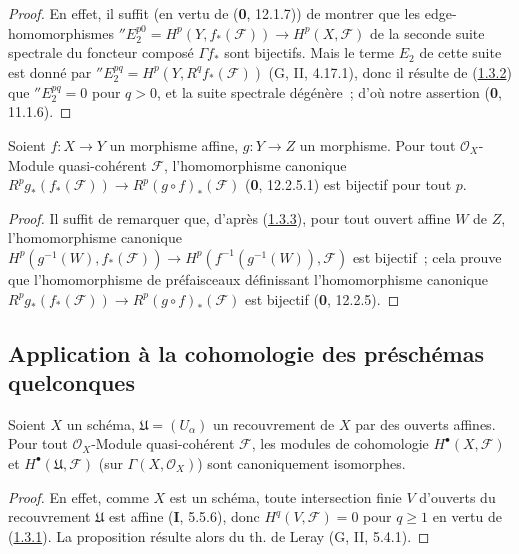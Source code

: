\begin{proof}
En effet, il suffit (en vertu de (\textbf{0}, 12.1.7)) de montrer que les
edge-homomorphismes
$''E_2^{p0}=H^p(Y,f_*(\mathcal F))\to H^p(X,\mathcal F)$ de la seconde suite
spectrale du foncteur composé $\Gamma f_*$ sont bijectifs. Mais le terme
$E_2$ de cette suite est donné par
$''E_2^{pq}=H^p(Y,R^qf_*(\mathcal F))$ (G, II, 4.17.1), donc il résulte de
(\hyperref[III.1.3.2-fr]{1.3.2}) que $''E_2^{pq}=0$ pour $q>0$, et la suite
spectrale dégénère~; d'où notre assertion (\textbf{0}, 11.1.6).
\end{proof}

\begin{corollary}[1.3.4]
\label{III.1.3.4-fr}
Soient $f:X\to Y$ un morphisme affine, $g:Y\to Z$ un morphisme.
Pour tout $\mathcal O_X$-Module quasi-cohérent $\mathcal F$,
l'homomorphisme canonique
$R^pg_*(f_*(\mathcal F))\to R^p(g\circ f)_*(\mathcal F)$ \textup{(\textbf{0}, 12.2.5.1)}
est bijectif pour tout $p$.
\end{corollary}

\begin{proof}
Il suffit de remarquer que, d'après
(\hyperref[III.1.3.3-fr]{1.3.3}), pour tout ouvert affine $W$ de $Z$,
l'homomorphisme canonique
$H^p(g^{-1}(W),f_*(\mathcal F))\to
H^p(f^{-1}(g^{-1}(W)),\mathcal F)$ est bijectif~; cela prouve que
l'homomorphisme de préfaisceaux définissant l'homomorphisme canonique
$R^pg_*(f_*(\mathcal F))\to R^p(g\circ f)_*(\mathcal F)$ est bijectif
(\textbf{0}, 12.2.5).
\end{proof}

\subsection{Application à la cohomologie des préschémas quelconques}
\label{subsection:III.1.4-fr}

\begin{proposition}[1.4.1]
\label{III.1.4.1-fr}
Soient $X$ un schéma, $\mathfrak U=(U_\alpha)$ un recouvrement de $X$ par
des ouverts affines. Pour tout $\mathcal O_X$-Module quasi-cohérent
$\mathcal F$, les modules de cohomologie $H^\bullet(X,\mathcal F)$ et
$H^\bullet(\mathfrak U,\mathcal F)$ (sur $\Gamma(X,\mathcal O_X)$) sont
canoniquement isomorphes.
\end{proposition}

\begin{proof}
En effet, comme $X$ est un schéma, toute intersection finie $V$ d'ouverts du
recouvrement $\mathfrak U$ est affine (\textbf{I}, 5.5.6), donc
$H^q(V,\mathcal F)=0$ pour $q\geq1$ en vertu de
(\hyperref[III.1.3.1-fr]{1.3.1}). La proposition résulte alors du th. de
Leray (G, II, 5.4.1).
\end{proof}

